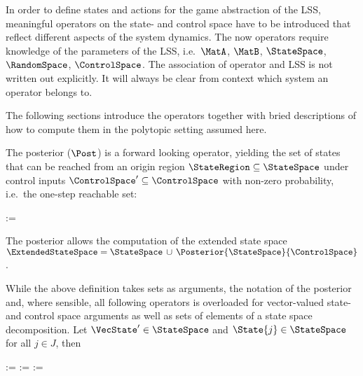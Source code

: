 In order to define states and actions for the game abstraction of the LSS, meaningful operators on the state- and control space have to be introduced that reflect different aspects of the system dynamics.
The now operators require knowledge of the parameters of the LSS, i.e.\ $\MatA$, $\MatB$, $\StateSpace$, $\RandomSpace$, $\ControlSpace$.
The association of operator and LSS is not written out explicitly.
It will always be clear from context which system an operator belongs to.

The following sections introduce the operators together with bried descriptions of how to compute them in the polytopic setting assumed here.


\startsubsection[title={Posterior}]

    The posterior ($\Post$) is a forward looking operator, yielding the set of states that can be reached from an origin region $\StateRegion \subseteq \StateSpace$ under control inputs $\ControlSpace' \subseteq \ControlSpace$ with non-zero probability, i.e.\ the one-step reachable set:

    \startformula
        \Posterior{\StateRegion}{\ControlRegion} :=  \EndPeriod
    \stopformula

    The posterior allows the computation of the extended state space $\ExtendedStateSpace = \StateSpace \,\cup\, \Posterior{\StateSpace}{\ControlSpace}$.

    While the above definition takes sets as arguments, the notation of the posterior and, where sensible, all following operators is overloaded for vector-valued state- and control space arguments as well as sets of elements of a state space decomposition.
    Let $\VecState' \in \StateSpace$ and $\State{j} \in \StateSpace$ for all $j \in J$, then

    \startformula
        \startalign[n=2,align={right,left}]
            \NC {} :=
            \NC {} \EndComma
            \NR
            \NC {} :=
            \NC {} \EndAnd
            \NR
            \NC {} :=
            \NC {} \EndPeriod
            \NR
        \stopalign
    \stopformula

